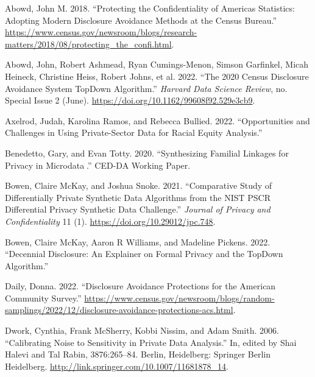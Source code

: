 \documentclass[
]{urban-formatting}
\newlength{\cslhangindent}
\newlength{\cslentryspacingunit} %
\newenvironment{CSLReferences}[2] %
 {%
  \setlength{\parindent}{0pt}
  \ifodd #1
  \let\oldpar\par
  \def\par{\hangindent=\cslhangindent\oldpar}
  \fi
  \setlength{\parskip}{#2\cslentryspacingunit}
 }%
 {}
\begin{document}
\hypertarget{refs}{}
\begin{CSLReferences}{1}{0}
\leavevmode{}%
Abowd, John M. 2018. {``Protecting the Confidentiality of Americas
Statistics: Adopting Modern Disclosure Avoidance Methods at the Census
Bureau.''}
\url{https://www.census.gov/newsroom/blogs/research-matters/2018/08/protecting_the_confi.html}.

\leavevmode{}%
Abowd, John, Robert Ashmead, Ryan Cumings-Menon, Simson Garfinkel, Micah
Heineck, Christine Heiss, Robert Johns, et al. 2022. {``The 2020 Census
Disclosure Avoidance System TopDown Algorithm.''} \emph{Harvard Data
Science Review}, no. Special Issue 2 (June).
\url{https://doi.org/10.1162/99608f92.529e3cb9}.

\leavevmode{}%
Axelrod, Judah, Karolina Ramos, and Rebecca Bullied. 2022.
{``Opportunities and Challenges in Using Private-Sector Data for Racial
Equity Analysis.''}

\leavevmode{}%
Benedetto, Gary, and Evan Totty. 2020. {``Synthesizing Familial Linkages
for Privacy in Microdata.''} CED-DA Working Paper.

\leavevmode{}%
Bowen, Claire McKay, and Joshua Snoke. 2021. {``Comparative Study of
Differentially Private Synthetic Data Algorithms from the NIST PSCR
Differential Privacy Synthetic Data Challenge.''} \emph{Journal of
Privacy and Confidentiality} 11 (1).
\url{https://doi.org/10.29012/jpc.748}.

\leavevmode{}%
Bowen, Claire McKay, Aaron R Williams, and Madeline Pickens. 2022.
{``Decennial Disclosure: An Explainer on Formal Privacy and the TopDown
Algorithm.''}

\leavevmode{}%
Daily, Donna. 2022. {``Disclosure Avoidance Protections for the American
Community Survey.''}
\url{https://www.census.gov/newsroom/blogs/random-samplings/2022/12/disclosure-avoidance-protections-acs.html}.

\leavevmode{}%
Dwork, Cynthia, Frank McSherry, Kobbi Nissim, and Adam Smith. 2006.
{``Calibrating Noise to Sensitivity in Private Data Analysis.''} In,
edited by Shai Halevi and Tal Rabin, 3876:265--84. Berlin, Heidelberg:
Springer Berlin Heidelberg.
\url{http://link.springer.com/10.1007/11681878_14}.


\end{CSLReferences}
\end{document}
